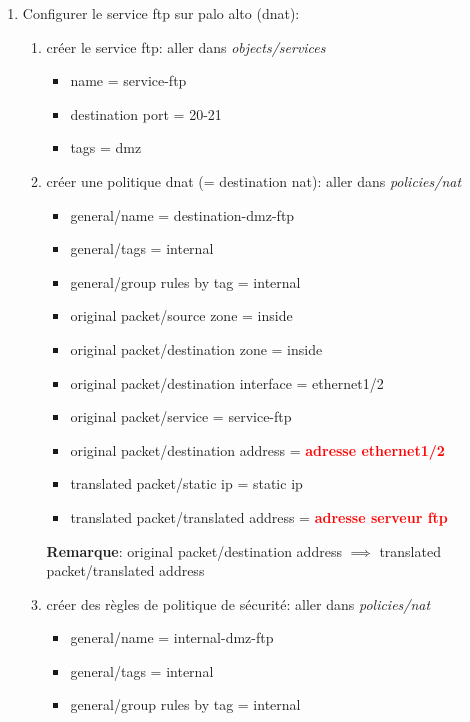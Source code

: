\documentclass[a4paper]{article}
\begin{document}
\begin{enumerate}
\item Configurer le service ftp sur palo alto (dnat):
\begin{enumerate}
    \item créer le service ftp: aller dans \textit{objects/services}
    \begin{example} \begin{itemize}
        \item name = service-ftp
        \item destination port = 20-21
        \item tags = dmz
    \end{itemize} \end{example}
    \item créer une politique dnat (= destination nat): aller dans \textit{policies/nat}
    \begin{example} \begin{itemize}
        \item general/name = destination-dmz-ftp
        \item general/tags = internal
        \item general/group rules by tag = internal
        \item original packet/source zone = inside
        \item original packet/destination zone = inside
        \item original packet/destination interface = ethernet1/2
        \item original packet/service = service-ftp
        \item original packet/destination address = \textcolor{red}{\textbf{adresse ethernet1/2}}
        \item translated packet/static ip = static ip
        \item translated packet/translated address = \textcolor{red}{\textbf{adresse serveur ftp}}
    \end{itemize} \end{example}
    \textbf{Remarque}: original packet/destination address $\implies$ translated packet/translated address
    \item créer des règles de politique de sécurité: aller dans \textit{policies/nat}
    \begin{example} \begin{itemize}
        \item general/name = internal-dmz-ftp
        \item general/tags = internal
        \item general/group rules by tag = internal

\end{itemize}
\end{example}
\end{enumerate}
\end{enumerate}
\end{document}
